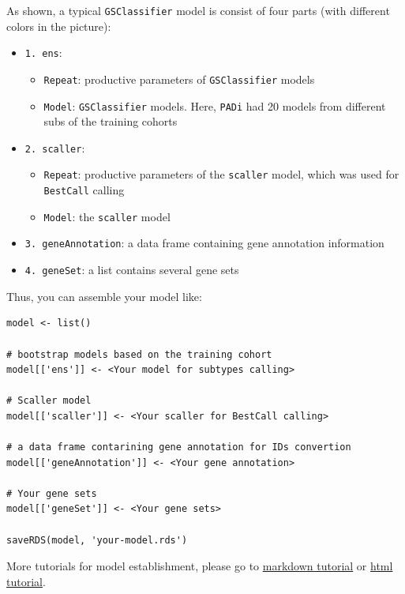 \documentclass[
  12pt,
]{book}
\providecommand{\tightlist}{%
  \setlength{\itemsep}{0pt}\setlength{\parskip}{0pt}}
\begin{document}
As shown, a typical \texttt{GSClassifier} model is consist of four parts (with different colors in the picture):

\begin{itemize}
\tightlist
\item
  \texttt{1.\ ens}:

  \begin{itemize}
  \tightlist
  \item
    \texttt{Repeat}: productive parameters of \texttt{GSClassifier} models
  \item
    \texttt{Model}: \texttt{GSClassifier} models. Here, \texttt{PADi} had 20 models from different subs of the training cohorts
  \end{itemize}
\item
  \texttt{2.\ scaller}:

  \begin{itemize}
  \tightlist
  \item
    \texttt{Repeat}: productive parameters of the \texttt{scaller} model, which was used for \texttt{BestCall} calling
  \item
    \texttt{Model}: the \texttt{scaller} model
  \end{itemize}
\item
  \texttt{3.\ geneAnnotation}: a data frame containing gene annotation information
\item
  \texttt{4.\ geneSet}: a list contains several gene sets
\end{itemize}

Thus, you can assemble your model like:

\begin{verbatim}
model <- list()

# bootstrap models based on the training cohort
model[['ens']] <- <Your model for subtypes calling>

# Scaller model
model[['scaller']] <- <Your scaller for BestCall calling>

# a data frame contarining gene annotation for IDs convertion
model[['geneAnnotation']] <- <Your gene annotation>

# Your gene sets
model[['geneSet']] <- <Your gene sets>

saveRDS(model, 'your-model.rds')
\end{verbatim}

More tutorials for model establishment, please go to \href{https://github.com/huangwb8/GSClassifier/wiki/Model-establishment}{markdown tutorial} or \href{http://htmlpreview.github.io/?https://raw.githubusercontent.com/wiki/huangwb8/GSClassifier/Model-establishment.html}{html tutorial}.
\end{document}
